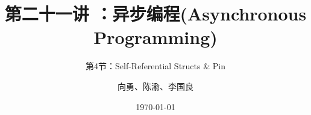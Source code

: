 


\title[第21讲]{第二十一讲 ：异步编程(Asynchronous Programming)} %
\subtitle{第4节：Self-Referential Structs \& Pin}
\author{向勇、陈渝、李国良} %
\date{\today} %



\begin{frame}
\titlepage %
\end{frame}


